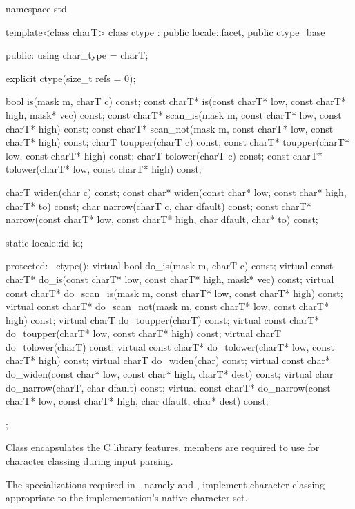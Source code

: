 %
\begin{codeblock}
namespace std {
  template<class charT>
    class ctype : public locale::facet, public ctype_base {
    public:
      using char_type = charT;

      explicit ctype(size_t refs = 0);

      bool         is(mask m, charT c) const;
      const charT* is(const charT* low, const charT* high, mask* vec) const;
      const charT* scan_is(mask m, const charT* low, const charT* high) const;
      const charT* scan_not(mask m, const charT* low, const charT* high) const;
      charT        toupper(charT c) const;
      const charT* toupper(charT* low, const charT* high) const;
      charT        tolower(charT c) const;
      const charT* tolower(charT* low, const charT* high) const;

      charT        widen(char c) const;
      const char*  widen(const char* low, const char* high, charT* to) const;
      char         narrow(charT c, char dfault) const;
      const charT* narrow(const charT* low, const charT* high, char dfault, char* to) const;

      static locale::id id;

    protected:
      ~ctype();
      virtual bool         do_is(mask m, charT c) const;
      virtual const charT* do_is(const charT* low, const charT* high, mask* vec) const;
      virtual const charT* do_scan_is(mask m, const charT* low, const charT* high) const;
      virtual const charT* do_scan_not(mask m, const charT* low, const charT* high) const;
      virtual charT        do_toupper(charT) const;
      virtual const charT* do_toupper(charT* low, const charT* high) const;
      virtual charT        do_tolower(charT) const;
      virtual const charT* do_tolower(charT* low, const charT* high) const;
      virtual charT        do_widen(char) const;
      virtual const char*  do_widen(const char* low, const char* high, charT* dest) const;
      virtual char         do_narrow(charT, char dfault) const;
      virtual const charT* do_narrow(const charT* low, const charT* high,
                                     char dfault, char* dest) const;
    };
}
\end{codeblock}

\pnum
Class
encapsulates the C library
features.
members are required to use
for character classing during input parsing.

\pnum
The specializations required in , namely
and
,
implement character classing appropriate
to the implementation's native character set.


